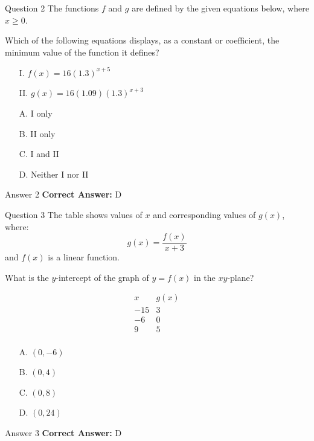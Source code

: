 \documentclass{beamer}
\begin{document}
\begin{frame}{Question 2}
\small
The functions \(f\) and \(g\) are defined by the given equations below, where \(x \geq 0\).

Which of the following equations displays, as a constant or coefficient, the minimum value of the function it defines?

\begin{itemize}
\item[I.] \(f(x) = 16(1.3)^{x+5}\)
\item[II.] \(g(x) = 16(1.09)(1.3)^{x+3}\)
\end{itemize}
\vspace{0.35cm}
\begin{enumerate}
    \item[A.] I only
    \item[B.] II only
    \item[C.] I and II
    \item[D.] Neither I nor II
\end{enumerate}
\end{frame}
\begin{frame}{Answer 2}
\small
\textbf{Correct Answer:} D
\end{frame}

\begin{frame}{Question 3}
\small
The table shows values of \(x\) and corresponding values of \(g(x)\), where:
\[
g(x) = \frac{f(x)}{x + 3}
\]
and \(f(x)\) is a linear function.

What is the \(y\)-intercept of the graph of \(y = f(x)\) in the \(xy\)-plane?

\[
\begin{array}{c|c}
x & g(x) \\
\hline
-15 & 3 \\
-6 & 0 \\
9 & 5 \\
\end{array}
\]
\vspace{0.35cm}
\begin{enumerate}
    \item[A.] \((0, -6)\)
    \item[B.] \((0, 4)\)
    \item[C.] \((0, 8)\)
    \item[D.] \((0, 24)\)
\end{enumerate}
\end{frame}
\begin{frame}{Answer 3}
\small
\textbf{Correct Answer:} D
\end{frame}
\end{document}
